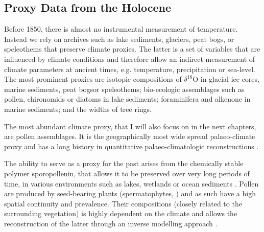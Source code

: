 \begin{refsection}
\subsection{Proxy Data from the Holocene}  \label{sec:holo-data}
Before 1850, there is almost no instrumental measurement of temperature. Instead we rely on archives such as lake sediments, glaciers, peat bogs, or speleothems that preserve climate proxies. The latter is a set of variables that are influenced by climate conditions and therefore allow an indirect measurement of climate parameters at ancient times, e.g. temperature, precipitation or sea-level. The most prominent proxies are isotopic compositions of $\delta^{18}$O in glacial ice cores\addref, marine sediments\addref, peat bogs\addref or speleothems\addref; bio-ecologic assemblages such as pollen\addref, chironomids \addref or diatoms \addref in lake sediments; foraminifera and alkenone in marine sediments\addref; and the widths of tree rings. 

The most abundant climate proxy, that I will also focus on in the next chapters, are pollen assemblages. It is the  geographically most wide spread palaeo-climate proxy \citep{BirksBirks1980}  and has a long history in quantitative palaeo-climatologic reconstructions \citep[e.g.][]{Nichols1967, Nichols1969, Bradley1985}. 

The ability to serve as a proxy for the past arises from the chemically stable polymer sporopollenin, that allows it to be preserved over very long periods of time, in various environments such as lakes, wetlands or ocean sediments  \citep{FaegriKalandKrzywinski1989, Havinga1967}. Pollen are produced by seed-bearing plants (spermatophytes, \cite{Wodehouse1935} ) and as such have a high spatial continuity and prevalence. Their compositions (closely related to the surrounding vegetation) is highly dependent on the climate and allows the reconstruction of the latter through an inverse modelling approach .


\end{refsection}
